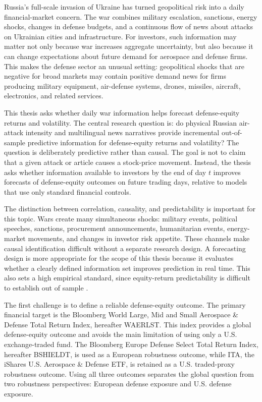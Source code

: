 \documentclass[12pt,a4paper]{article}
\begin{document}
Russia's full-scale invasion of Ukraine has turned geopolitical risk into a daily financial-market concern. The war combines military escalation, sanctions, energy shocks, changes in defense budgets, and a continuous flow of news about attacks on Ukrainian cities and infrastructure. For investors, such information may matter not only because war increases aggregate uncertainty, but also because it can change expectations about future demand for aerospace and defense firms. This makes the defense sector an unusual setting: geopolitical shocks that are negative for broad markets may contain positive demand news for firms producing military equipment, air-defense systems, drones, missiles, aircraft, electronics, and related services.

This thesis asks whether daily war information helps forecast defense-equity returns and volatility. The central research question is: do physical Russian air-attack intensity and multilingual news narratives provide incremental out-of-sample predictive information for defense-equity returns and volatility? The question is deliberately predictive rather than causal. The goal is not to claim that a given attack or article causes a stock-price movement. Instead, the thesis asks whether information available to investors by the end of day $t$ improves forecasts of defense-equity outcomes on future trading days, relative to models that use only standard financial controls.

The distinction between correlation, causality, and predictability is important for this topic. Wars create many simultaneous shocks: military events, political speeches, sanctions, procurement announcements, humanitarian events, energy-market movements, and changes in investor risk appetite. These channels make causal identification difficult without a separate research design. A forecasting design is more appropriate for the scope of this thesis because it evaluates whether a clearly defined information set improves prediction in real time. This also sets a high empirical standard, since equity-return predictability is difficult to establish out of sample \citep{goyal2008equity}.

The first challenge is to define a reliable defense-equity outcome. The primary financial target is the Bloomberg World Large, Mid and Small Aerospace \& Defense Total Return Index, hereafter WAERLST. This index provides a global defense-equity outcome and avoids the main limitation of using only a U.S. exchange-traded fund. The Bloomberg Europe Defense Select Total Return Index, hereafter BSHIELDT, is used as a European robustness outcome, while ITA, the iShares U.S. Aerospace \& Defense ETF, is retained as a U.S. traded-proxy robustness outcome. Using all three outcomes separates the global question from two robustness perspectives: European defense exposure and U.S. defense exposure.
\end{document}
